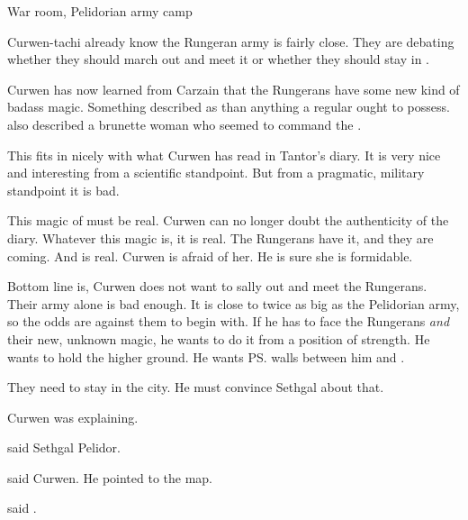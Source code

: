 \placestamp
  {War room, Pelidorian army camp}



Curwen-tachi already know the Rungeran army is fairly close. 
They are debating whether they should march out and meet it or whether they should stay in \Forklin. 

Curwen has now learned from Carzain that the Rungerans have some new kind of badass magic. 
Something \Shireyo described as  than anything a regular \ishrah ought to possess. 
\Shireyo also described a brunette woman who seemed to command the \ishrah. 

This fits in nicely with what Curwen has read in Tantor's diary. 
It is very nice and interesting from a scientific standpoint. 
But from a pragmatic, military standpoint it is bad. 

This magic of \EreshKal must be real. 
Curwen can no longer doubt the authenticity of the diary. 
Whatever this \EreshKali magic is, it is real. 
The Rungerans have it, and they are coming. 
And \Takestsha is real. 
Curwen is afraid of her.
He is sure she is formidable.

Bottom line is, Curwen does not want to sally out and meet the Rungerans. 
Their army alone is bad enough.
It is close to twice as big as the Pelidorian army, so the odds are against them to begin with.
If he has to face the Rungerans \emph{and} their new, unknown magic, he wants to do it from a position of strength. 
He wants to hold the higher ground. 
He wants \ps{\Forklin} walls between him and \Takestsha. 

They need to stay in the city.
He must convince Sethgal about that. 



 Curwen was explaining. 

 said Sethgal Pelidor. 

 said Curwen. 
He pointed to the map. 

 said \Dornaer. 

